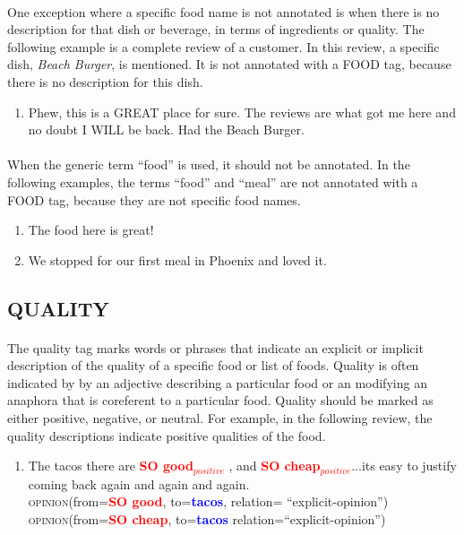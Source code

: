 \documentclass{article}
\begin{document}
\paragraph{}
One exception where a specific food name is not annotated is when there is no description for that dish or beverage, in terms of ingredients or quality. The following example is a complete review of a customer. In this review, a specific dish, \textit{Beach Burger}, is mentioned. It is not annotated with a FOOD tag, because there is no description for this dish.

\begin{enumerate}[resume]
\item Phew, this is a GREAT place for sure. The reviews are what got me here and no doubt I WILL be back. Had the Beach Burger.
\end{enumerate}

\paragraph{}
When the generic term ``food'' is used, it should not be annotated. In the following examples, the terms ``food'' and ``meal'' are not annotated with a FOOD tag, because they are not specific food names. 
\begin{enumerate}[resume]
\item The food here is great!
\item We stopped for our first meal in Phoenix and loved it.
\end{enumerate}


\subsection{QUALITY}
\paragraph{}
The quality tag marks words or phrases that indicate an explicit or implicit description of the quality of a specific food or list of foods. Quality is often indicated by by an adjective describing a particular food or an modifying an anaphora that is coreferent to a particular food. Quality should be marked as either positive, negative, or neutral. For example, in the following review, the quality descriptions indicate positive qualities of the food.

\begin{enumerate}[resume]
\item The tacos there are \textbf{\textcolor{red}{SO good$_{positive}$}} , and \textbf{\textcolor{red}{SO cheap$_{positive}$}}...its easy to justify coming back again and again and again.\\
\textsc{opinion}(from=\textbf{\textcolor{red}{SO good}}, to=\textbf{\textcolor{blue}{tacos}}, relation= ``explicit-opinion'')\\
\textsc{opinion}(from=\textbf{\textcolor{red}{SO cheap}}, to=\textbf{\textcolor{blue}{tacos}} relation=``explicit-opinion'')
\end{enumerate}
\end{document}
